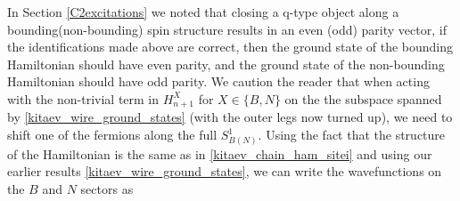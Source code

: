 In Section \ref{C2excitations} we noted that closing a q-type object along a bounding(non-bounding) spin structure results in an even (odd) parity vector, if the identifications made above are correct, then the ground state of the bounding Hamiltonian should have even parity, and the ground state of the non-bounding Hamiltonian should have odd parity. 
We caution the reader that when acting with the non-trivial term in $H^{X}_{n+1}$ for $X\in \{B,N\}$
on the the subspace spanned by \eqref{kitaev_wire_ground_states} (with the outer legs now turned up), 
we need to shift one of the fermions along the full $S^1_{B(N)}$.
Using the fact that the structure of the Hamiltonian is the same as in \eqref{kitaev_chain_ham_sitei} and using our earlier results \eqref{kitaev_wire_ground_states}, we can write the wavefunctions on the $B$ and $N$ sectors as 

